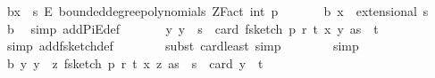 \begin{isabellebody}
\ b{\isacharunderscore}{\kern0pt}{}{\isacharcolon}{\kern0pt}{\isachardoublequoteopen}x\ {\isasymin}\ {\isacharbraceleft}{\kern0pt}{}{\isachardot}{\kern0pt}{\isachardot}{\kern0pt}{\isacharless}{\kern0pt}s{\isacharbraceright}{\kern0pt}\ {\isasymrightarrow}\isactrlsub E\ bounded{\isacharunderscore}{\kern0pt}degree{\isacharunderscore}{\kern0pt}polynomials\ {\isacharparenleft}{\kern0pt}ZFact\ {\isacharparenleft}{\kern0pt}int\ p{\isacharparenright}{\kern0pt}{\isacharparenright}{\kern0pt}\ {}{\isachardoublequoteclose}\isanewline
\ \ \ \ \isamarkupfalse%
\ b{\isacharunderscore}{\kern0pt}{}{\isacharcolon}{\kern0pt}\ {\isachardoublequoteopen}x\ {\isasymin}\ extensional\ {\isacharbraceleft}{\kern0pt}{}{\isachardot}{\kern0pt}{\isachardot}{\kern0pt}{\isacharless}{\kern0pt}s{\isacharbraceright}{\kern0pt}{\isachardoublequoteclose}\ \isamarkupfalse%
\ b{\isacharunderscore}{\kern0pt}{}\ \isamarkupfalse%
\ {\isacharparenleft}{\kern0pt}simp\ add{\isacharcolon}{\kern0pt}PiE{\isacharunderscore}{\kern0pt}def{\isacharparenright}{\kern0pt}\ \isanewline
\isanewline
\ \ \ \ \isamarkupfalse%
\ {\isachardoublequoteopen}{\isasymAnd}y{\isachardot}{\kern0pt}\ y\ {\isasymin}\ {\isacharbraceleft}{\kern0pt}{}{\isachardot}{\kern0pt}{\isachardot}{\kern0pt}{\isacharless}{\kern0pt}s{\isacharbraceright}{\kern0pt}\ {\isasymLongrightarrow}\ card\ {\isacharparenleft}{\kern0pt}f{}{\isacharunderscore}{\kern0pt}sketch\ p\ r\ t\ {\isacharparenleft}{\kern0pt}x\ y{\isacharparenright}{\kern0pt}\ as{\isacharparenright}{\kern0pt}\ {\isasymle}\ t\ {\isachardoublequoteclose}\isanewline
\ \ \ \ \ \ \isamarkupfalse%
\ {\isacharparenleft}{\kern0pt}simp\ add{\isacharcolon}{\kern0pt}f{}{\isacharunderscore}{\kern0pt}sketch{\isacharunderscore}{\kern0pt}def{\isacharparenright}{\kern0pt}\isanewline
\ \ \ \ \ \ \isamarkupfalse%
\ {\isacharparenleft}{\kern0pt}subst\ card{\isacharunderscore}{\kern0pt}least{\isacharcomma}{\kern0pt}\ simp{\isacharparenright}{\kern0pt}\isanewline
\ \ \ \ \ \ \isamarkupfalse%
\ simp\isanewline
\isanewline
\ \ \ \ \isamarkupfalse%
\ b{\isacharunderscore}{\kern0pt}{}{\isacharcolon}{\kern0pt}\ {\isachardoublequoteopen}{\isasymAnd}y{\isachardot}{\kern0pt}\ y\ {\isasymin}\ {\isacharparenleft}{\kern0pt}{\isasymlambda}z{\isachardot}{\kern0pt}\ f{}{\isacharunderscore}{\kern0pt}sketch\ p\ r\ t\ {\isacharparenleft}{\kern0pt}x\ z{\isacharparenright}{\kern0pt}\ as{\isacharparenright}{\kern0pt}\ {\isacharbackquote}{\kern0pt}\ {\isacharbraceleft}{\kern0pt}{}{\isachardot}{\kern0pt}{\isachardot}{\kern0pt}{\isacharless}{\kern0pt}s{\isacharbraceright}{\kern0pt}\ {\isasymLongrightarrow}\ card\ y\ {\isasymle}\ t{\isachardoublequoteclose}\isanewline

\end{isabellebody}
